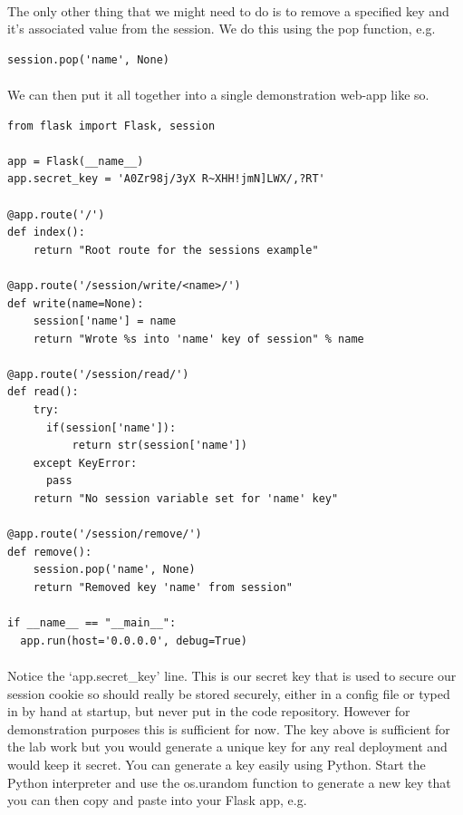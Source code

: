 \documentclass[12pt, a4paper, oneside]{book}
\begin{document}
{\paragraph{} The only other thing that we might need to do is to remove a specified key and it's associated value from the session. We do this using the pop function, e.g.
\begin{lstlisting}
session.pop('name', None)
\end{lstlisting}

\paragraph{} We can then put it all together into a single demonstration web-app like so.

\begin{lstlisting}
from flask import Flask, session

app = Flask(__name__)
app.secret_key = 'A0Zr98j/3yX R~XHH!jmN]LWX/,?RT'

@app.route('/')
def index():
    return "Root route for the sessions example"

@app.route('/session/write/<name>/')
def write(name=None):
    session['name'] = name
    return "Wrote %s into 'name' key of session" % name

@app.route('/session/read/')
def read():
    try:
      if(session['name']):
          return str(session['name'])
    except KeyError:
      pass
    return "No session variable set for 'name' key"

@app.route('/session/remove/')
def remove():
    session.pop('name', None)
    return "Removed key 'name' from session"

if __name__ == "__main__":
  app.run(host='0.0.0.0', debug=True)
\end{lstlisting}

\paragraph{} Notice the `app.secret\_key' line. This is our secret key that is used to secure our session cookie so should really be stored securely, either in a config file or typed in by hand at startup, but never put in the code repository. However for demonstration purposes this is sufficient for now. The key above is sufficient for the lab work but you would generate a unique key for any real deployment and would keep it secret. You can generate a key easily using Python. Start the Python interpreter and use the os.urandom function to generate a new key that you can then copy and paste into your Flask app, e.g.

}
\end{document}
